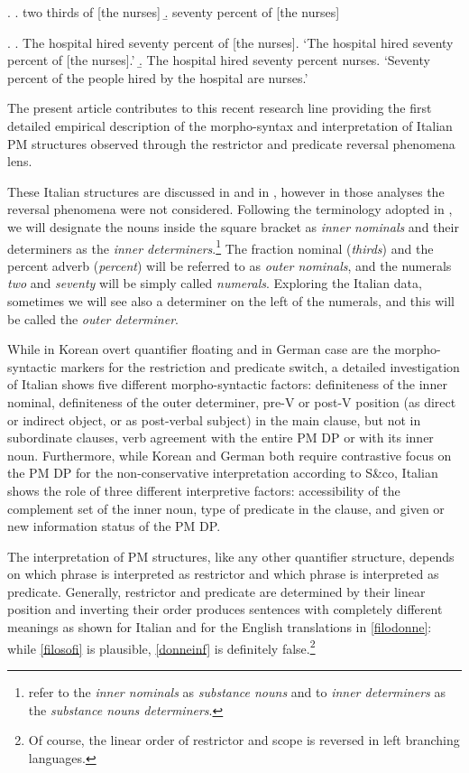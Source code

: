 \documentclass[charis, linguex]{glossa}
\begin{document}
\ex. \a. two thirds of [the nurses] \label{nur}
     \b. seventy percent of [the nurses] \label{nur1}
	 
\ex. \a. The hospital hired seventy percent of [the nurses]. 
        \glt  `The hospital hired seventy percent of [the nurses].' \label{nurs} 
     \b. The hospital hired seventy percent nurses. 
	    \glt  `Seventy percent of the people hired by the hospital are nurses.' \label{nurs1} 


The present article contributes to this recent research line providing the first detailed empirical description of the morpho-syntax and interpretation of Italian PM structures observed through the restrictor and predicate reversal phenomena lens. 

These Italian structures are discussed in \citet[\S4]{fal19} and in \citet{fal23}, however in those analyses the reversal phenomena were not considered. Following the terminology adopted in \citet[\S4]{fal19}, we will designate the nouns inside the square bracket as \textit{inner nominals} and their determiners as the \textit{inner determiners}.\footnote{\citet{pas22} refer to the \textit{inner nominals} as \textit{substance nouns} and to \textit{inner determiners} as the \textit{substance nouns determiners}. } The fraction nominal (\textit{thirds}) and the percent adverb (\textit{percent}) will be referred to as \textit{outer nominals}, and the numerals \textit{two} and \textit{seventy} will be simply called \textit{numerals}. Exploring the Italian data, sometimes we will see also a determiner on the left of the numerals, and this will be called the \textit{outer determiner}.


While in Korean overt quantifier floating and in German case are the morpho-syntactic markers for the restriction and predicate switch, a detailed investigation of Italian shows five different morpho-syntactic factors: definiteness of the inner nominal, definiteness of the outer determiner, pre-V or post-V position (as direct or indirect object, or as post-verbal subject) in the main clause, but not in subordinate clauses, verb agreement with the entire PM DP or with its inner noun. Furthermore, while Korean and German both require contrastive focus on the PM DP for the non-conservative interpretation according to S\&co, Italian shows the role of three different interpretive factors: accessibility of the complement set of the inner noun, type of predicate in the clause, and given or new information status of the PM DP.


The interpretation of PM structures, like any other quantifier structure, depends on which phrase is interpreted as restrictor and which phrase is interpreted as predicate. Generally, restrictor and predicate are determined by their linear position and inverting their order produces sentences with completely different meanings as shown for Italian and for the English translations in \ref{filodonne}: while \ref{filosofi} is plausible, \ref{donneinf} is definitely false.\footnote{Of course, the linear order of restrictor and scope is reversed in left branching languages.} 
\end{document}
